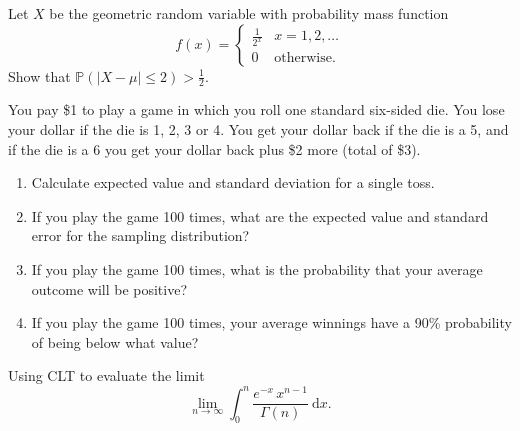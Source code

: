 \begin{mdframed}
    \vspace{-0.25cm}
    \hspace{-0.25cm}
    \begin{Exercise}
        Let $X$ be the geometric random variable with probability mass function
        \[
            f(x) = \begin{cases}
                \displaystyle \frac{1}{2^x} & x = 1,2,\ldots\\
                0 & \text{otherwise}.
            \end{cases}
        \]
        Show that $\mathbb{P}(|X - \mu| \leq 2) > \frac{1}{2}$.
    \end{Exercise}

    \vspace{0.752cm}
    \begin{Exercise}
        You pay \$1 to play a game in which you roll one standard six-sided die. You lose your dollar if the 
        die is 1, 2, 3 or 4. You get your dollar back if the die is a 5, and if the die is a 6 you get your dollar 
        back plus \$2 more (total of \$3).
        \begin{enumerate}
            \item Calculate expected value and standard deviation for a single toss.
            \item If you play the game 100 times, what are the expected value and standard error for the sampling 
                distribution?
            \item If you play the game 100 times, what is the probability that your average outcome will be positive?
            \item If you play the game 100 times, your average winnings have a 90\% probability of being below 
                what value?
        \end{enumerate}
    \end{Exercise}

    \vspace{0.752cm}
    \begin{Exercise}
        Using CLT to evaluate the limit
        \[
            \lim_{n \to \infty} \int^{n}_0 \frac{e^{-x}\, x^{n-1}}{\Gamma(n)} \> \mathrm{d}x.
        \]
    \end{Exercise}
\end{mdframed}